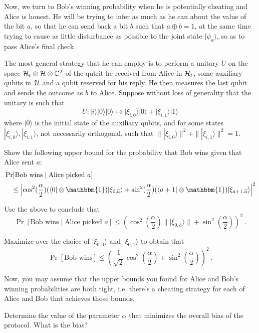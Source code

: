 \documentclass[a4paper,10pt,landscape,twocolumn]{scrartcl}
\newcommand{\ket}[1]{| #1 \rangle}
\newcommand{\bra}[1]{\langle #1 |}
\begin{document}
\begin{exercise}
\begin{subex}
Now, we turn to Bob's winning probability when he is potentially cheating and Alice is honest. 
He will be trying to infer as much as he can about the value of the bit $a$, so that he can send back a bit $b$ such that $a \oplus b=1$, at the same time trying to cause as little disturbance as possible to the joint state $\ket{\psi_a}$, so as to pass Alice's final check.

The most general strategy that he can employ is to perform a unitary $U$ on the space $\mathcal{H}_t \otimes \mathcal{H} \otimes \mathbb{C}^2$ of the qutrit he received from Alice in $\mathcal{H}_t$, some auxiliary qubits in $\mathcal{H}$ and a qubit reserved for his reply. He then measures the last qubit and sends the outcome as $b$ to Alice. 
Suppose without loss of generality that the unitary is such that
\[
U: \ket{i} \ket{\overline{0}} \ket{0} \mapsto \ket{\xi_{i,0}} \ket{0} + \ket{\xi_{i,1}} \ket{1}
\]
where $\ket{\overline{0}}$ is the initial state of the auxiliary qubits, and for some states $\ket{\xi_{i,0}}, \ket{\xi_{i,1}}$, not necessarily orthogonal, such that $\| \ket{\xi_{i,0}} \|^2 + \| \ket{\xi_{i,1}} \|^2 = 1$.

Show the following upper bound for the probability that Bob wins given that Alice sent $a$:
\[
\begin{split}
&\Pr[\text{Bob wins} \mid \text{Alice picked $a$}] \\
&\quad \leq \left| \cos^2(\frac{\alpha}{2}) (\bra{0} \otimes \mathbbm{1}) \ket{\xi_{0,\overline{a}}} + \sin^2(\frac{\alpha}{2}) (\bra{a+1} \otimes \mathbbm{1}) \ket{\xi_{a+1,\overline{a}}} \right|^2
\end{split}
\]
\end{subex}

\begin{subex}
Use the above to conclude that 
\[
\Pr[\text{Bob wins} \mid \text{Alice picked $a$}] \leq \left( \cos^2(\frac{\alpha}{2}) \| \ket{\xi_{0,\overline{a}}} \| +  \sin^2(\frac{\alpha}{2}) \right)^2 \, .
\]
\end{subex}


\begin{subex}
Maximize over the choice of $\ket{\xi_{0,0}}$ and $\ket{\xi_{0,1}}$ to obtain that
\[
\Pr[\text{Bob wins} ] \leq \left( \frac{1}{\sqrt{2}} \cos^2(\frac{\alpha}{2}) + \sin^2(\frac{\alpha}{2}) \right)^2 \, .
\]
\end{subex}

\begin{subex}
Now, you may assume that the upper bounds you found for Alice and Bob's winning probabilities are both tight, i.e. there's a cheating strategy for each of Alice and Bob that achieves those bounds.

Determine the value of the parameter $\alpha$ that minimizes the overall bias of the protocol. What is the bias?
\end{subex}
\end{exercise}
\end{document}
